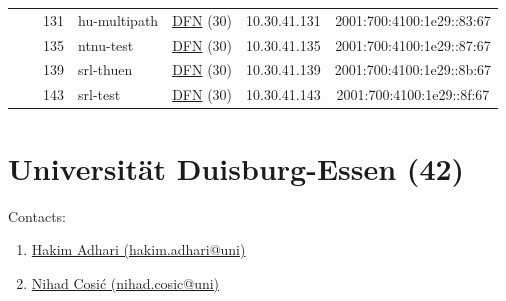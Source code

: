 \begin{small}
\begin{center}
\begin{longtable}{|c|c|c|c|c|c|c|c|}
  &  & \tiny{131} & \multicolumn{1}{|l|}{\tiny{hu-multipath}} & \multicolumn{2}{|c|}{\tiny{\href{https://www.dfn.de}{DFN} (30)}} & \tiny{10.30.41.131} & \tiny{2001:700:4100:1e29::83:67} \\* \cline{3-3}\cline{4-4}\cline{5-5}\cline{6-6}\cline{7-7}\cline{8-8}
  &  & \tiny{135} & \multicolumn{1}{|l|}{\tiny{ntnu-test}} & \multicolumn{2}{|c|}{\tiny{\href{https://www.dfn.de}{DFN} (30)}} & \tiny{10.30.41.135} & \tiny{2001:700:4100:1e29::87:67} \\* \cline{3-3}\cline{4-4}\cline{5-5}\cline{6-6}\cline{7-7}\cline{8-8}
  &  & \tiny{139} & \multicolumn{1}{|l|}{\tiny{srl-thuen}} & \multicolumn{2}{|c|}{\tiny{\href{https://www.dfn.de}{DFN} (30)}} & \tiny{10.30.41.139} & \tiny{2001:700:4100:1e29::8b:67} \\* \cline{3-3}\cline{4-4}\cline{5-5}\cline{6-6}\cline{7-7}\cline{8-8}
  &  & \tiny{143} & \multicolumn{1}{|l|}{\tiny{srl-test}} & \multicolumn{2}{|c|}{\tiny{\href{https://www.dfn.de}{DFN} (30)}} & \tiny{10.30.41.143} & \tiny{2001:700:4100:1e29::8f:67} \\ \hline
\end{longtable}
\end{center}
\end{small}



\section{Universität Duisburg-Essen (42)}
\label{sec:UDE}

Contacts:
\begin{enumerate}
 \item {}\href{mailto:hakim.adhari@uni}{Hakim Adhari (hakim.adhari@uni)}
 \item {}\href{mailto:nihad.cosic@uni}{Nihad Cosić (nihad.cosic@uni)}
\end{enumerate}


